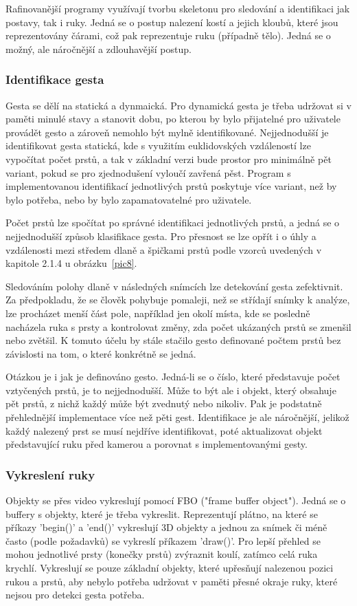 Rafinovanější programy využívají tvorbu skeletonu pro sledování a identifikaci jak postavy, tak i ruky. Jedná se o postup nalezení kostí a jejich kloubů, které jsou reprezentovány čárami, což pak reprezentuje ruku (případně tělo). Jedná se o možný, ale náročnější a zdlouhavější postup.

\subsubsection{Identifikace gesta}
Gesta se dělí na statická a dynmaická. Pro dynamická gesta je třeba udržovat si v paměti minulé stavy a stanovit dobu, po kterou by bylo přijatelné pro uživatele provádět gesto a zároveň  nemohlo být mylně identifikované. Nejjednodušší je identifikovat gesta statická, kde s využitím euklidovských vzdáleností lze vypočítat počet prstů, a tak v základní verzi bude prostor pro minimálně pět variant, pokud se pro zjednodušení vyloučí zavřená pěst. Program s implementovanou identifikací jednotlivých prstů poskytuje více variant, než by bylo potřeba, nebo by bylo zapamatovatelné pro uživatele.

Počet prstů lze spočítat po správné identifikaci jednotlivých prstů, a jedná se o nejjednodušší způsob klasifikace gesta. Pro přesnost se lze opřít i o úhly a vzdálenosti mezi středem dlaně a špičkami prstů podle vzorců uvedených v kapitole 2.1.4 u obrázku~\ref{pic8}.

Sledováním polohy dlaně v následných snímcích lze detekování gesta zefektivnit. Za předpokladu, že se člověk pohybuje pomaleji, než se střídají snímky k analýze, lze procházet menší část pole, například jen okolí místa, kde se posledně nacházela ruka s prsty a kontrolovat změny, zda počet ukázaných prstů se zmenšil nebo zvětšil. K tomuto účelu by stále stačilo gesto definované počtem prstů bez závislosti na tom, o které konkrétně se jedná.

Otázkou je i jak je definováno gesto. Jedná-li se o číslo, které představuje počet vztyčených prstů, je to nejjednodušší. Může to být ale i objekt, který obsahuje pět prstů, z nichž každý může být zvednutý nebo nikoliv. Pak je podstatně přehlednější implementace více než pěti gest. Identifikace je ale náročnější, jelikož každý nalezený prst se musí nejdříve identifikovat, poté aktualizovat objekt představující ruku před kamerou a porovnat s implementovanými gesty. 

\subsubsection{Vykreslení ruky}
Objekty se přes video vykreslují pomocí FBO ("frame buffer object"). Jedná se o buffery s objekty, které je třeba vykreslit. Reprezentují plátno, na které se příkazy 'begin()' a 'end()' vykreslují 3D objekty a jednou za snímek či méně často (podle požadavků) se vykreslí příkazem 'draw()'. Pro lepší přehled se mohou jednotlivé prsty (konečky prstů) zvýraznit koulí, zatímco celá ruka krychlí. Vykreslují se pouze základní objekty, které upřesňují nalezenou pozici rukou a prstů, aby nebylo potřeba udržovat v paměti přesné okraje ruky, které nejsou pro detekci gesta potřeba.

